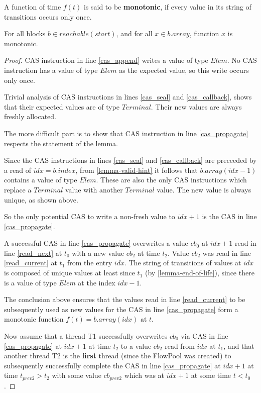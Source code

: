 \documentclass[runningheads,a4paper]{llncs}
\begin{document}
\begin{definition}[Monotonicity]
A function of time $f(t)$ is said to be \textbf{monotonic}, if every value in its string of transitions occurs only once.
\end{definition}


\begin{lemma}[Freshness]\label{lemma-freshness}
For all blocks $b \in reachable(start)$, and for all $x \in b.array$,
function $x$ is monotonic.
\end{lemma}

\begin{proof}
CAS instruction in line \ref{cas_append} writes a value of type
$Elem$. No CAS instruction has a value of type $Elem$ as the expected value,
so this write occurs only once.

Trivial analysis of CAS instructions in lines \ref{cas_seal} and
\ref{cas_callback}, shows that their expected values are of type
$Terminal$. Their new values are always freshly allocated.

The more difficult part is to show that CAS instruction in line
\ref{cas_propagate} respects the statement of the lemma.

Since the CAS instructions in lines \ref{cas_seal} and
\ref{cas_callback} are preceeded by a read of $idx = b.index$,
from \ref{lemma-valid-hint} it follows that $b.array(idx - 1)$ 
contains a value of type $Elem$.
These are also the only CAS instructions which replace a $Terminal$
value with another $Terminal$ value. The new value is always unique, as
shown above.

So the only potential CAS to write a non-fresh value to $idx + 1$ is the CAS
in line \ref{cas_propagate}.

A successful CAS in line \ref{cas_propagate} overwrites a value $cb_0$ at $idx + 1$
read in line \ref{read_next} at $t_0$ with a new value $cb_2$ at time $t_2$. Value $cb_2$ was
read in line \ref{read_current} at $t_1$ from the entry $idx$. The
string of transitions of values at $idx$ is composed of unique values
at least since $t_1$ (by \ref{lemma-end-of-life}), since there is
a value of type $Elem$ at the index $idx - 1$.

The conclusion above ensures that the values read in line \ref{read_current}
to be subsequently used as new values for the CAS in line \ref{cas_propagate}
form a monotonic function $f(t) = b.array(idx) \text{ at } t$.

Now assume that a thread T1 successfully overwrites $cb_0$
via CAS in line \ref{cas_propagate} at $idx + 1$ at time $t_2$ 
to a value $cb_2$ read from $idx$ at $t_1$, and that another thread T2 
is the \textbf{first} thread (since the FlowPool was created) to subsequently successfully
complete the CAS in line \ref{cas_propagate} at $idx + 1$ at time
$t_{prev2} > t_2$ with some value $cb_{prev2}$ which was at $idx + 1$ at some time
$t < t_0$.


\end{proof}
\end{document}
